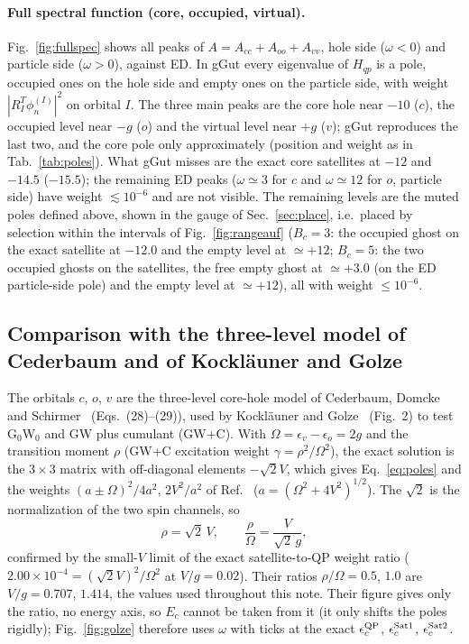 \documentclass[11pt]{article}
\begin{document}
\paragraph{Full spectral function (core, occupied, virtual).}
Fig.~\ref{fig:fullspec} shows all peaks of $A=A_{cc}+A_{oo}+A_{vv}$, hole side ($\omega<0$) and particle side ($\omega>0$), against ED.
In gGut every eigenvalue of $H_{qp}$ is a pole, occupied ones on the hole side and empty ones on the particle side, with weight $|R_I^T\phi^{(I)}_n|^2$ on orbital $I$.
The three main peaks are the core hole near $-10$ ($c$), the occupied level near $-g$ ($o$) and the virtual level near $+g$ ($v$); gGut reproduces the last two, and the core pole only approximately (position and weight as in Tab.~\ref{tab:poles}).
What gGut misses are the exact core satellites at $-12$ and $-14.5$ ($-15.5$); the remaining ED peaks ($\omega\simeq3$ for $c$ and $\omega\simeq12$ for $o$, particle side) have weight $\lesssim10^{-6}$ and are not visible.
The remaining levels are the muted poles defined above, shown in the gauge of Sec.~\ref{sec:place}, i.e.\ placed by selection within the intervals of Fig.~\ref{fig:rangeauf} ($B_c=3$: the occupied ghost on the exact satellite at $-12.0$ and the empty level at $\simeq+12$; $B_c=5$: the two occupied ghosts on the satellites, the free empty ghost at $\simeq+3.0$ (on the ED particle-side pole) and the empty level at $\simeq+12$), all with weight $\le10^{-6}$.

\subsection{Comparison with the three-level model of Cederbaum and of Kockl\"auner and Golze}
\label{sec:golze}

The orbitals $c$, $o$, $v$ are the three-level core-hole model of Cederbaum, Domcke and Schirmer~\cite{Cederbaum1980} (Eqs.~(28)--(29)), used by Kockl\"auner and Golze~\cite{Kocklauner2024} (Fig.~2) to test G$_0$W$_0$ and GW plus cumulant (GW+C).
With $\Omega=\epsilon_v-\epsilon_o=2g$ and the transition moment $\rho$ (GW+C excitation weight $\gamma=\rho^2/\Omega^2$), the exact solution is the $3\times3$ matrix with off-diagonal elements $-\sqrt2V$, which gives Eq.~\eqref{eq:poles} and the weights $(a\pm\Omega)^2/4a^2$, $2V^2/a^2$ of Ref.~\cite{Cederbaum1980}
($a=(\Omega^2+4V^2)^{1/2}$). The $\sqrt2$ is the normalization of the two spin channels, so
\begin{equation}
\rho=\sqrt2\,V,\qquad \frac{\rho}{\Omega}=\frac{V}{\sqrt2\,g},
\end{equation}
confirmed by the small-$V$ limit of the exact satellite-to-QP weight ratio ($2.00\times10^{-4}=(\sqrt2V)^2/\Omega^2$ at $V/g=0.02$). Their ratios $\rho/\Omega=0.5$, $1.0$ are $V/g=0.707$, $1.414$, the values used throughout this note.
Their figure gives only the ratio, no energy axis, so $E_c$ cannot be taken from it (it only shifts the poles rigidly); Fig.~\ref{fig:golze} therefore uses $\omega$ with ticks at the exact $\epsilon_c^{\rm QP}$, $\epsilon_c^{\rm Sat1}$, $\epsilon_c^{\rm Sat2}$.
\end{document}
